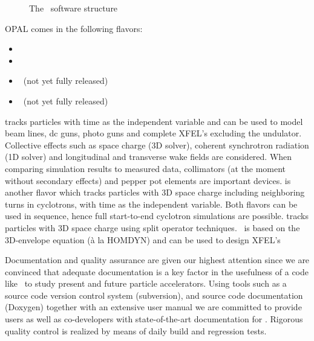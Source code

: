 \documentclass[acus]{JAC2003}
\begin{document}
\begin{figure}[htb]
\begin{center}
\caption{The \opal\ software structure}
\label{fig:opalstr}
\end{center}
\end{figure}


OPAL comes in the following flavors:
\begin{itemize}
\item \opalt
\item \opalcycl 
\item \opalmap\ (not yet fully released)
\item \opalenv\ (not yet fully released)
\end{itemize}

\opalt  tracks particles with time as the independent variable and can be used to model beam lines, dc guns, photo guns and complete XFEL's excluding the undulator. 
Collective effects such as space charge (3D solver), coherent synchrotron radiation (1D solver) and longitudinal and transverse wake fields are considered.
When comparing simulation results to measured data, collimators (at the moment without secondary effects) and pepper pot elements are important devices. 
\opalcycl is another flavor which tracks particles with 3D space charge including neighboring turns in cyclotrons, with time as the independent variable. Both flavors can be used in sequence, hence
full start-to-end cyclotron simulations are possible.  
\opalmap tracks particles with 3D space charge using split operator techniques.  \opalenv\ is based on the 3D-envelope equation (\`a la HOMDYN) and can be used to design XFEL's

Documentation and quality assurance are given our highest attention since we are convinced that adequate documentation 
is a key factor in the usefulness of a code like \opal\ to study present and future particle accelerators. 
Using tools such as a source code version control system (subversion), and source code documentation (Doxygen) together with an extensive user manual
we are committed to provide users as well as co-developers with state-of-the-art documentation for \opal. Rigorous quality control is realized by means of daily build and regression tests.
\end{document}
